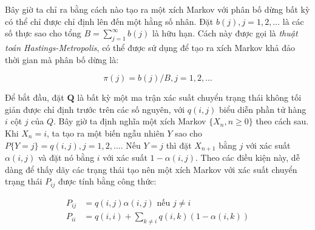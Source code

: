 \documentclass[14pt, a4paper]{article}
\numberwithin{equation}{section}
\numberwithin{figure}{section}
\theoremstyle{sltheorem}
\theoremstyle{soltheorem}
\numberwithin{dl}{section}
\numberwithin{md}{section}
\numberwithin{vd}{section}
\begin{document}
    Bây giờ ta chỉ ra bằng cách nào tạo ra một xích Markov với phân bố dừng bất kỳ có thể chỉ được chỉ định lên đến một hằng số nhân.
    Đặt $b(j), j=1, 2, \dots$ là các số thực sao cho tổng $B= \sum_{j=1}^{\infty} b(j)$ là hữu hạn.
    Cách này được gọi là \textit{thuật toán Hastings-Metropolis}, có thể được sử dụng để tạo ra xích Markov khả đảo thời gian mà phân bố dừng là:

    \begin{equation*}
        \pi (j) = b(j) / B, j = 1, 2, \dots
    \end{equation*}

    Để bắt đầu, đặt $\mathbf{Q}$ là bất kỳ một ma trận xác suất chuyển trạng thái không tối giản được chỉ định trước trên các số nguyên, với $q(i, j)$ biểu diễn phần tử hàng $i$ cột $j$ của $Q$.
    Bây giờ ta định nghĩa một xích Markov $\lbrace X_n, n \geq 0 \rbrace$ theo cách sau.
    Khi $X_n = i$, ta tạo ra một biến ngẫu nhiên $Y$ sao cho $P \lbrace Y = j \rbrace = q(i, j), j=1, 2, \dots$. Nếu $Y=j$ thì đặt $X_{n+1}$ bằng $j$ với xác suất $\alpha(i, j)$ và đặt nó bằng $i$ với xác suất $1 - \alpha(i, j)$.
    Theo các điều kiện này, dễ dàng để thấy dãy các trạng thái tạo nên một xích Markov với xác suất chuyển trạng thái $P_{ij}$ được tính bằng công thức:

    \begin{equation*}
        \begin{aligned}
            P_{ij} &= q(i, j)\alpha(i, j) \text{ nếu } j \neq i \\
            P_{ii} &= q(i, i) + \sum_{k \neq i} q(i, k)(1 - \alpha(i, k))
        \end{aligned}
    \end{equation*}
\end{document}
